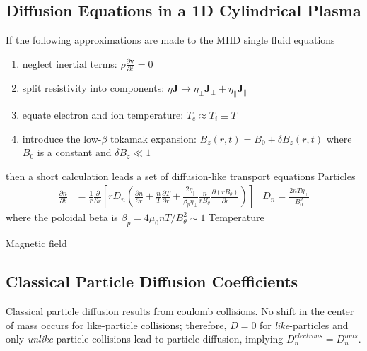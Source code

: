 \subsection{Diffusion Equations in a 1D Cylindrical Plasma}
If the following approximations are made to the MHD single fluid equations 
\begin{enumerate}
  \item{neglect inertial terms: $\rho\frac{\partial \textbf{v}}{\partial t} = 0$}
  \item{split resistivity into components: $\eta\textbf{J} \rightarrow \eta_\perp\textbf{J}_\perp + \eta_\parallel\textbf{J}_\parallel$}
  \item{equate electron and ion temperature: $T_e \approx T_i \equiv T$}
  \item{introduce the low-$\beta$ tokamak expansion: $B_z(r,t) = B_0 + \delta B_z(r,t)$ where $B_0$ is a constant and $\delta B_z \ll 1$}
\end{enumerate}
then a short calculation leads a set of diffusion-like transport equations
\newline\newline
\noindent
Particles 
\begin{align*}
  \frac{\partial n}{\partial t} &= \frac{1}{r}\frac{\partial}{\partial r} \left[rD_n\left(\frac{\partial n}{\partial r} + \frac{n}{T}
    \frac{\partial T}{\partial r} + \frac{2\eta_\parallel}{\beta_p\eta_\perp}\frac{n}{rB_\theta}\frac{\partial (rB_\theta)}{\partial r}\right)\right] &
  D_n = \frac{2nT\eta_\perp}{B_0^2}
\end{align*}
\indent where the poloidal beta is $\beta_p = 4\mu_0nT/B_\theta^2 \sim 1$
\newline\newline
\noindent
Temperature 

\noindent
Magnetic field 

\subsection{Classical Particle Diffusion Coefficients}
Classical particle diffusion results from coulomb collisions.  No
shift in the center of mass occurs for like-particle collisions;
therefore, $D = 0$ for \textit{like}-particles and only
\textit{unlike}-particle collisions lead to particle diffusion,
implying $D_n^{electrons} = D_n^{ions}$.\\

